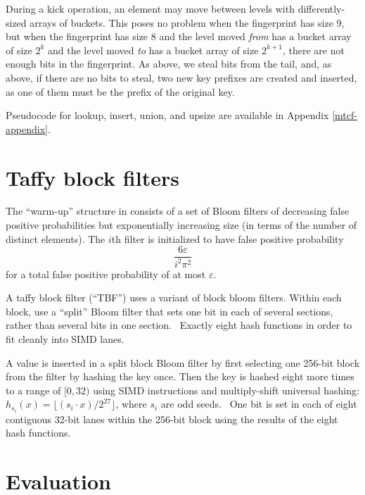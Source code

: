 \documentclass[manuscript,screen,review]{acmart}
\begin{document}

During a kick operation, an element may move between levels with differently-sized arrays of buckets.
This poses no problem when the fingerprint has size 9, but when the fingerprint has size 8 and the level moved {\em from} has a bucket array of size $2^k$ and the level moved {\em to} has a bucket array of size $2^{k+1}$,  there are not enough bits in the fingerprint.
As above, we steal bits from the tail, and, as above, if there are no bits to steal, two new key prefixes are created and inserted, as one of them must be the prefix of the original key.

Pseudocode for lookup, insert, union, and upsize are available in Appendix \ref{mtcf-appendix}.

\section{Taffy block filters}
\label{pbf}

The ``warm-up'' structure in \cite{psw} consists of a set of Bloom filters of decreasing false positive probabilities but exponentially increasing size (in terms of the number of distinct elements).
The $i$th filter is initialized to have false positive probability
\[
\frac{6 \varepsilon}  {i^2 \pi^2}
\]
for a total false positive probability of at most $\varepsilon$.

A taffy block filter (``TBF'') uses a variant of block bloom filters. \cite{block-bloom, ultra-fast}
Within each block, use a ``split'' Bloom filter that sets one bit in each of several sections, rather than several bits in one section.~\cite{split-bloom}
Exactly eight hash functions in order to fit cleanly into SIMD lanes.

A value is inserted in a split block Bloom filter by first selecting one 256-bit block from the filter by hashing the key once.
Then the key is hashed eight more times to a range of $[0,32)$ using SIMD instructions and multiply-shift universal hashing: $h_{s_i}(x) = \lfloor(s_i \cdot x) / 2^{27}\rfloor$, where $s_i$ are odd seeds.~\cite{multiply-shift}
One bit is set in each of eight contiguous 32-bit lanes within the 256-bit block using the results of the eight hash functions.



\section{Evaluation}
\label{eval}
\end{document}
